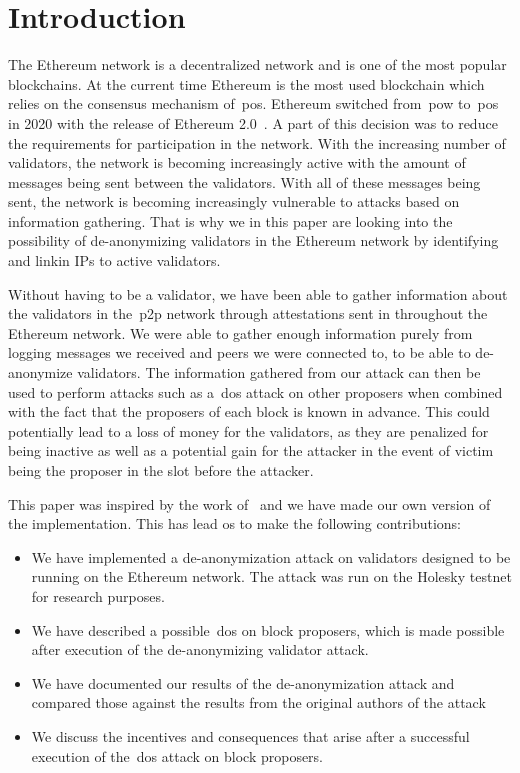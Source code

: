 

\section{Introduction}\label{sec:introduction}
The Ethereum network is a decentralized network and is one of the most popular blockchains.
At the current time Ethereum is the most used blockchain which relies on the consensus mechanism of~\gls{pos}.
Ethereum switched from~\gls{pow} to~\gls{pos} in 2020 with the release of Ethereum 2.0~\cite{EthereumProof-of-stakePoS}.
A part of this decision was to reduce the requirements for participation in the network.
With the increasing number of validators, the network is becoming increasingly active with the amount of messages being sent between the validators.
With all of these messages being sent, the network is becoming increasingly vulnerable to attacks based on information gathering.
That is why we in this paper are looking into the possibility of de-anonymizing validators in the Ethereum network by identifying and linkin IPs to active validators.


Without having to be a validator, we have been able to gather information about the validators in the~\gls{p2p} network through attestations sent in throughout the Ethereum network.
We were able to gather enough information purely from logging messages we received and peers we were connected to, to be able to de-anonymize validators.
The information gathered from our attack can then be used to perform attacks such as a~\gls{dos} attack on other proposers when combined with the fact that the proposers of each block is known in advance.
This could potentially lead to a loss of money for the validators, as they are penalized for being inactive as well as a potential gain for the attacker in the event of victim being the proposer in the slot before the attacker.

This paper was inspired by the work of~\cite{heimbach2024deanonymizingethereumvalidatorsp2p} and we have made our own version of the implementation.
This has lead os to make the following contributions:
\begin{itemize}
    \item We have implemented a de-anonymization attack on validators designed to be running on the Ethereum network.
    The attack was run on the Holesky testnet for research purposes.
    \item We have described a possible~\gls{dos} on block proposers, which is made possible after execution of the de-anonymizing validator attack.
    \item We have documented our results of the de-anonymization attack and compared those against the results from the original authors of the attack~\cite{heimbach2024deanonymizingethereumvalidatorsp2p}
    \item We discuss the incentives and consequences that arise after a successful execution of the~\gls{dos} attack on block proposers.
\end{itemize}
\


